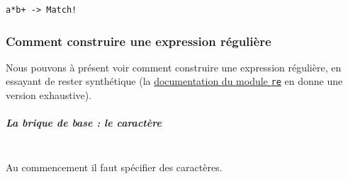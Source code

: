     \begin{Verbatim}[commandchars=\\\{\}]
a*b+ -> Match!

    \end{Verbatim}

    \hypertarget{comment-construire-une-expression-ruxe9guliuxe8re}{%
\subsubsection{Comment construire une expression
régulière}\label{comment-construire-une-expression-ruxe9guliuxe8re}}

    Nous pouvons à présent voir comment construire une expression régulière,
en essayant de rester synthétique (la
\href{https://docs.python.org/3/library/re.html}{documentation du module
\texttt{re}} en donne une version exhaustive).

    \hypertarget{la-brique-de-base-le-caractuxe8re}{%
\subparagraph{La brique de base : le
caractère\\\\}\label{la-brique-de-base-le-caractuxe8re}}

    Au commencement il faut spécifier des caractères.
    
